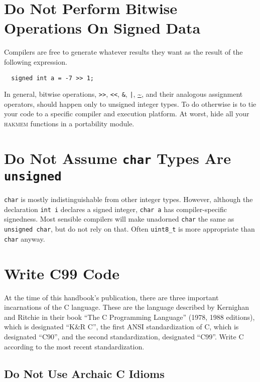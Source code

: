 \documentclass{lulu}
\newcommand{\code}[1]{\texttt{#1}\xspace}
\begin{document}
\section{Do Not Perform Bitwise Operations On Signed Data}

Compilers are free to generate whatever results they want as the
result of the following expression.

\begin{samepage}
\begin{verbatim}
  signed int a = -7 >> 1;
\end{verbatim}
\end{samepage}

In general, bitwise operations, \code{>>}, \code{<<}, \code{\&},
\code{|}, \url{~}, and their analogous assignment operators, should
happen only to unsigned integer types.  To do otherwise is to tie your
code to a specific compiler and execution platform.  At worst, hide
all your \textsc{hakmem} functions in a portability module.

\section{Do Not Assume \code{char} Types Are \code{unsigned}}

\code{char} is mostly indistinguishable from other integer types.
However, although the declaration \code{int i} declares a signed
integer, \code{char a} has compiler-specific signedness.  Most
sensible compilers will make unadorned \code{char} the same as
\code{unsigned char}, but do not rely on that.  Often \code{uint8\_t}
is more appropriate than \code{char} anyway.

\section{Write C99 Code}

At the time of this handbook's publication, there are three important
incarnations of the C language.  These are the language described by
Kernighan and Ritchie in their book ``The C Programming Language''
(1978, 1988 editions), which is designated ``K\&R C'', the first ANSI
standardization of C, which is designated ``C90'', and the second
standardization, designated ``C99''.  Write C according to the most
recent standardization.

\subsection{Do Not Use Archaic C Idioms} 
\end{document}
